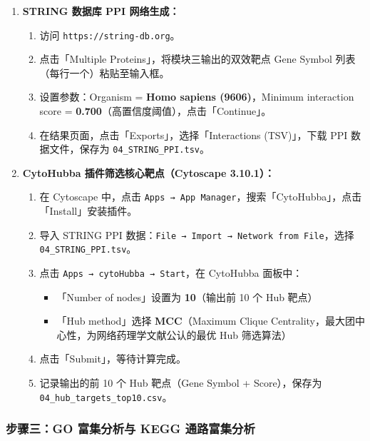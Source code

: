 \documentclass[12pt,a4paper,twoside]{article}
\newcommand{\clickpath}[1]{\texttt{#1}}
\begin{document}
\begin{enumerate}
  \item \textbf{STRING 数据库 PPI 网络生成：}
    \begin{enumerate}
      \item 访问 \texttt{https://string-db.org}。
      \item 点击「Multiple Proteins」，将模块三输出的双效靶点 Gene Symbol 列表（每行一个）粘贴至输入框。
      \item 设置参数：Organism = \textbf{Homo sapiens (9606)}，Minimum interaction score = \textbf{0.700}（高置信度阈值），点击「Continue」。
      \item 在结果页面，点击「Exports」，选择「Interactions (TSV)」，下载 PPI 数据文件，保存为 \texttt{04\_STRING\_PPI.tsv}。
    \end{enumerate}

  \item \textbf{CytoHubba 插件筛选核心靶点（Cytoscape 3.10.1）：}
    \begin{enumerate}
      \item 在 Cytoscape 中，点击 \clickpath{Apps → App Manager}，搜索「CytoHubba」，点击「Install」安装插件。
      \item 导入 STRING PPI 数据：\clickpath{File → Import → Network from File}，选择 \texttt{04\_STRING\_PPI.tsv}。
      \item 点击 \clickpath{Apps → cytoHubba → Start}，在 CytoHubba 面板中：
        \begin{itemize}
          \item 「Number of nodes」设置为 \textbf{10}（输出前 10 个 Hub 靶点）
          \item 「Hub method」选择 \textbf{MCC}（Maximum Clique Centrality，最大团中心性，为网络药理学文献公认的最优 Hub 筛选算法）
        \end{itemize}
      \item 点击「Submit」，等待计算完成。
      \item 记录输出的前 10 个 Hub 靶点（Gene Symbol + Score），保存为 \texttt{04\_hub\_targets\_top10.csv}。
    \end{enumerate}
\end{enumerate}

\subsubsection{步骤三：GO 富集分析与 KEGG 通路富集分析}
\end{document}
